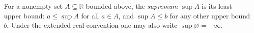 
For a nonempty set $A\subseteq\mathbb R$ bounded above, the \emph{supremum} $\sup A$ is its least upper bound: $a\le\sup A$ for all $a\in A$, and $\sup A\le b$ for any other upper bound $b$. Under the extended-real convention one may also write $\sup\varnothing=-\infty$.
